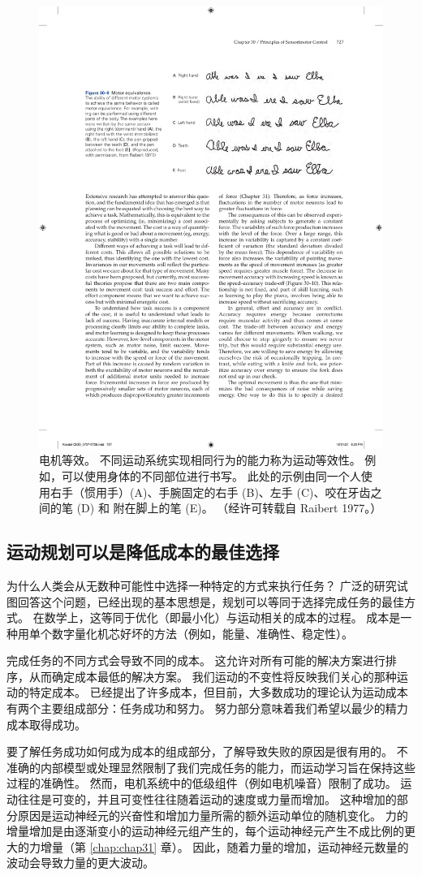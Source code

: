 \begin{figure}[htbp]
	\centering
	\includegraphics[width=0.7\linewidth]{chap30/fig_30_9}
	\caption{电机等效。 不同运动系统实现相同行为的能力称为运动等效性。 例如，可以使用身体的不同部位进行书写。 此处的示例由同一个人使用右手（惯用手）(A)、手腕固定的右手 (B)、左手 (C)、咬在牙齿之间的笔 (D) 和 附在脚上的笔 (E)。 （经许可转载自 Raibert 1977。）}
	\label{fig:30_9}
\end{figure}



\subsection{运动规划可以是降低成本的最佳选择}

为什么人类会从无数种可能性中选择一种特定的方式来执行任务？
广泛的研究试图回答这个问题，已经出现的基本思想是，规划可以等同于选择完成任务的最佳方式。
在数学上，这等同于优化（即最小化）与运动相关的成本的过程。
成本是一种用单个数字量化机芯好坏的方法（例如，能量、准确性、稳定性）。


完成任务的不同方式会导致不同的成本。
这允许对所有可能的解决方案进行排序，从而确定成本最低的解决方案。
我们运动的不变性将反映我们关心的那种运动的特定成本。
已经提出了许多成本，但目前，大多数成功的理论认为运动成本有两个主要组成部分：任务成功和努力。
努力部分意味着我们希望以最少的精力成本取得成功。


要了解任务成功如何成为成本的组成部分，了解导致失败的原因是很有用的。
不准确的内部模型或处理显然限制了我们完成任务的能力，而运动学习旨在保持这些过程的准确性。
然而，电机系统中的低级组件（例如电机噪音）限制了成功。 运动往往是可变的，并且可变性往往随着运动的速度或力量而增加。 这种增加的部分原因是运动神经元的兴奋性和增加力量所需的额外运动单位的随机变化。 力的增量增加是由逐渐变小的运动神经元组产生的，每个运动神经元产生不成比例的更大的力增量（第 \ref{chap:chap31} 章）。 因此，随着力量的增加，运动神经元数量的波动会导致力量的更大波动。


